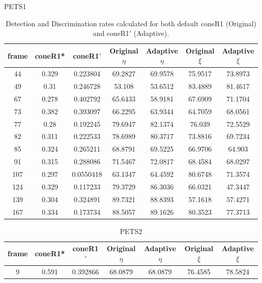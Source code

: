 \begin{appendices}
\begin{table}
\centering
\caption{PETS1}
\begin{tabular}{ |c|c|c|c|c|c|c| }
\hline
\textbf{frame} &  \textbf{coneR1*} &  \textbf{coneR1$'$} &  \textbf{Original $\eta$} &  \textbf{Adaptive $\eta$} &  \textbf{Original $\xi$} &  \textbf{Adaptive $\xi$} \\
\hline
\hline
44 &  0.329 &  0.223804 &  69.2827 &  69.9578 &  75.9517 &  73.8973 \\
\hline
49 &  0.31 &  0.246728 &  53.108 &  53.6512 &  83.4889 &  81.4617 \\
\hline
67 &  0.278 &  0.402792 &  65.6433 &  58.9181 &  67.6909 &  71.1704 \\
\hline
73 &  0.382 &  0.393097 &  66.2295 &  63.9344 &  64.7059 &  68.0561 \\
\hline
77 &  0.28 &  0.192245 &  79.6947 &  82.1374 &  76.039 &  72.5529 \\
\hline
82 &  0.311 &  0.222533 &  78.6989 &  80.3717 &  73.8816 &  69.7234 \\
\hline
85 &  0.324 &  0.265211 &  68.8791 &  69.5225 &  66.9706 &  64.903 \\
\hline
91 &  0.315 &  0.288086 &  71.5467 &  72.0817 &  68.4584 &  68.0297 \\
\hline
107 &  0.297 &  0.0550418 &  63.1347 &  64.4592 &  80.6748 &  71.3574 \\
\hline
124 &  0.329 &  0.117233 &  79.3729 &  86.3036 &  66.0321 &  47.3447 \\
\hline
139 &  0.304 &  0.324891 &  89.7321 &  88.8393 &  57.1618 &  57.4271 \\
\hline
167 &  0.334 &  0.173734 &  88.5057 &  89.1626 &  80.3523 &  77.3713 \\
\hline
\end{tabular}
\caption*{Detection and Discrimination rates calculated for both default coneR1 (Original) and coneR1$'$ (Adaptive).}
\end{table}
\begin{table}
\centering
\caption{PETS2}
\begin{tabular}{ |c|c|c|c|c|c|c| }
\hline
\textbf{frame} &  \textbf{coneR1*} &  \textbf{coneR1$'$} &  \textbf{Original $\eta$} &  \textbf{Adaptive $\eta$} &  \textbf{Original $\xi$} &  \textbf{Adaptive $\xi$} \\
\hline
\hline
9 &  0.591 &  0.392866 &  68.0879 &  68.0879 &  76.4585 &  78.5824 \\

\end{tabular}
\end{table}
\end{appendices}
